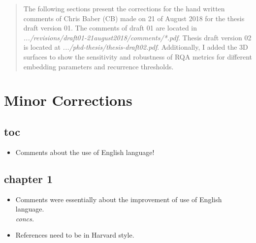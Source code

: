 \documentclass[10pt]{article}
\begin{document}
\maketitle


\begin{abstract}
The following sections present the corrections for the hand written comments 
of Chris Baber (CB) made on 21 of August 2018 for the thesis draft version 01. 
The comments of draft 01 are located in \emph{.../revisions/draft01-21august2018/comments/*.pdf}.
Thesis draft version 02 is located at \emph{.../phd-thesis/thesis-draft02.pdf}.
Additionally, I added the 3D surfaces to show the sensitivity and robustness 
of RQA metrics for different embedding parameters and recurrence thresholds.
\end{abstract}


\section{Minor Corrections}

\subsection{toc}

\begin{itemize}[noitemsep,topsep=0pt]
\item Comments about the use of English language!
\end{itemize}

\subsection{chapter 1}

\begin{itemize}[noitemsep,topsep=0pt]
\item Comments were essentially about the improvement of use of English language. \\
\textit{concs.}


\item References need to be in Harvard style. 
\end{itemize}
\end{document}

